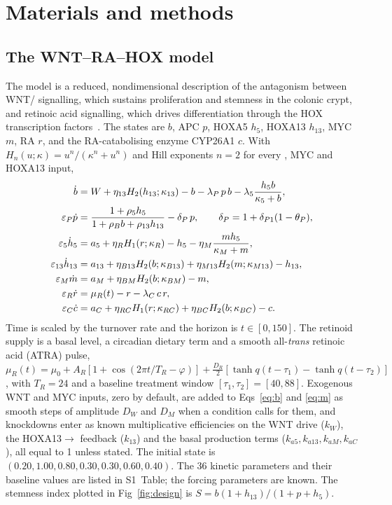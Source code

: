 \section{Materials and methods}
\label{sec:methods}

\subsection{The WNT--RA--HOX model}
\label{sec:model}

The model is a reduced, nondimensional description of the antagonism between
WNT/\bcat{} signalling, which sustains proliferation and stemness in the colonic
crypt, and retinoic acid signalling, which drives differentiation through the
HOX transcription
factors~\citep{clevers2012wnt,nusse2017wnt,ordonezmoran2015hoxa5,bhatlekar2014hox,rhinn2012retinoic}.
The states are \bcat{} $b$, APC $p$, HOXA5 $h_5$, HOXA13 $h_{13}$, MYC $m$, RA
$r$, and the RA-catabolising enzyme CYP26A1 $c$. With $H_n(u;\kappa) =
u^n/(\kappa^n+u^n)$ and Hill exponents $n=2$ for every \bcat{}, MYC and HOXA13
input,
\begin{align}
\dot b &= W + \eta_{13}H_{2}(h_{13};\kappa_{13}) - b - \lambda_P\,p\,b
        - \lambda_5\frac{h_5 b}{\kappa_5+b}, \label{eq:b}\\
\varepsilon_P\dot p &= \frac{1+\rho_5 h_5}{1+\rho_B b+\rho_{13}h_{13}}
        - \delta_P\,p, \qquad \delta_P = 1+\delta_{P1}(1-\theta_P), \label{eq:p}\\
\varepsilon_5\dot h_5 &= a_5 + \eta_R H_1(r;\kappa_R) - h_5
        - \eta_M\frac{m h_5}{\kappa_M+m}, \label{eq:h5}\\
\varepsilon_{13}\dot h_{13} &= a_{13} + \eta_{B13}H_{2}(b;\kappa_{B13})
        + \eta_{M13}H_{2}(m;\kappa_{M13}) - h_{13}, \label{eq:h13}\\
\varepsilon_M\dot m &= a_M + \eta_{BM}H_{2}(b;\kappa_{BM}) - m, \label{eq:m}\\
\varepsilon_R\dot r &= \mu_R(t) - r - \lambda_C\,c\,r, \label{eq:r}\\
\varepsilon_C\dot c &= a_C + \eta_{RC}H_1(r;\kappa_{RC})
        + \eta_{BC}H_{2}(b;\kappa_{BC}) - c. \label{eq:c}
\end{align}
Time is scaled by the \bcat{} turnover rate and the horizon is $t\in[0,150]$.
The retinoid supply is a basal level, a circadian dietary term and a smooth
all-\emph{trans} retinoic acid (ATRA) pulse,
$\mu_R(t) = \mu_0 + A_R[1+\cos(2\pi t/T_R-\varphi)] +
\tfrac{D_R}{2}[\tanh q(t-\tau_1)-\tanh q(t-\tau_2)]$, with $T_R=24$ and a
baseline treatment window $[\tau_1,\tau_2]=[40,88]$. Exogenous WNT and MYC
inputs, zero by default, are added to Eqs~\eqref{eq:b} and \eqref{eq:m} as
smooth steps of amplitude $D_W$ and $D_M$ when a condition calls for them, and
knockdowns enter as known multiplicative efficiencies on the WNT drive ($k_W$),
the HOXA13$\to$\bcat{} feedback ($k_{13}$) and the basal production terms
($k_{a5},k_{a13},k_{aM},k_{aC}$), all equal to 1 unless stated. The initial
state is $(0.20,1.00,0.80,0.30,0.30,0.60,0.40)$. The 36 kinetic parameters and
their baseline values are listed in S1~Table; the forcing parameters are known.
The stemness index plotted in Fig~\ref{fig:design} is
$S=b(1+h_{13})/(1+p+h_5)$.

